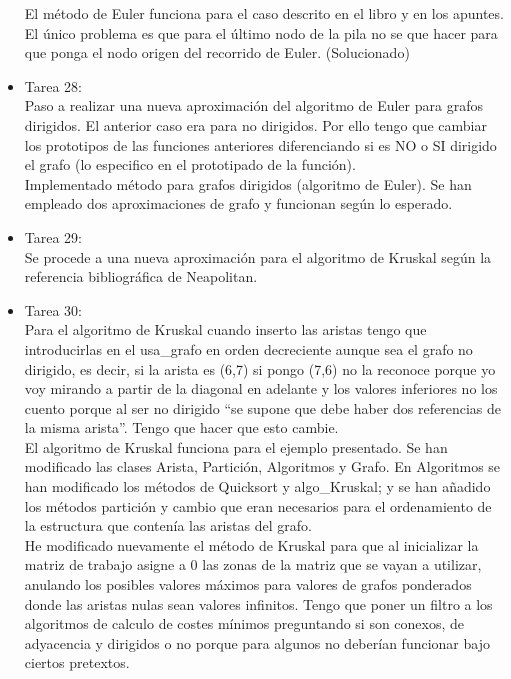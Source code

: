 \begin{itemize}
El método de Euler funciona para el caso descrito en el libro y en los apuntes. El único problema es que para el último nodo de la pila no se que hacer para que ponga el nodo origen del recorrido de Euler. (Solucionado)\\

\item Tarea 28:\\
Paso a realizar una nueva aproximación del algoritmo de Euler para grafos dirigidos. El anterior caso era para no dirigidos. Por ello tengo que cambiar los prototipos de las funciones anteriores diferenciando si es NO o SI dirigido el grafo (lo especifico en el prototipado de la función).\\

Implementado método para grafos dirigidos (algoritmo de Euler). Se han empleado dos aproximaciones de grafo y funcionan según lo esperado.\\

\item Tarea 29:\\
Se procede a una nueva aproximación para el algoritmo de Kruskal según la referencia bibliográfica de Neapolitan.\\

\item Tarea 30:\\
Para el algoritmo de Kruskal cuando inserto las aristas tengo que introducirlas en el usa\_grafo en orden decreciente aunque sea el grafo no dirigido, es decir, si la arista es (6,7) si pongo (7,6) no la reconoce porque yo voy mirando a partir de la diagonal en adelante y los valores inferiores no los cuento porque al ser no dirigido ``se supone que debe haber dos referencias de la misma arista''. Tengo que hacer que esto cambie.\\

El algoritmo de Kruskal funciona para el ejemplo presentado. Se han modificado las clases Arista, Partición, Algoritmos y Grafo. En Algoritmos se han modificado los métodos de Quicksort y algo\_Kruskal; y se han añadido los métodos partición y cambio que eran necesarios para el ordenamiento de la estructura que contenía las aristas del grafo.\\

He modificado nuevamente el método de Kruskal para que al inicializar la matriz de trabajo asigne a 0 las zonas de la matriz que se vayan a utilizar, anulando los posibles valores máximos para valores de grafos ponderados donde las aristas nulas sean valores infinitos. Tengo que poner un filtro a los algoritmos de calculo de costes mínimos preguntando si son conexos, de adyacencia y dirigidos o no porque para algunos no deberían funcionar bajo ciertos pretextos.\\


\end{itemize}
